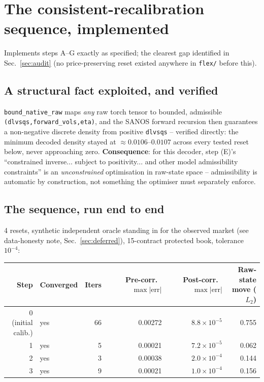 \section{The consistent-recalibration sequence, implemented}
\label{sec:sec5}

Implements steps A--G exactly as specified; the clearest gap identified in
Sec.~\ref{sec:audit} (no price-preserving reset existed anywhere in
\texttt{flex/} before this).

\subsection{A structural fact exploited, and verified}

\texttt{bound\_native\_raw} maps \emph{any} raw torch tensor to bounded,
admissible \texttt{(dlvsqs,forward\_vols,eta)}, and the SANOS forward
recursion then guarantees a non-negative discrete density from positive
\texttt{dlvsqs} -- verified directly: the minimum decoded density stayed at
$\approx0.0106$--$0.0107$ across every tested reset below, never approaching
zero. \textbf{Consequence}: for this decoder, step (E)'s ``constrained
inverse... subject to positivity... and other model admissibility
constraints'' is an \emph{unconstrained} optimisation in raw-state space --
admissibility is automatic by construction, not something the optimiser must
separately enforce.

\subsection{The sequence, run end to end}

4 resets, synthetic independent oracle standing in for the observed market
(see data-honesty note, Sec.~\ref{sec:deferred}), 15-contract protected book,
tolerance $10^{-4}$:

\begin{center}
\begin{tabular}{rlrrrr}
\toprule
Step & Converged & Iters & Pre-corr.\ $\max|\text{err}|$ & Post-corr.\ $\max|\text{err}|$ & Raw-state move ($L_2$) \\
\midrule
0 (initial calib.) & yes & 66 & 0.00272 & $8.8\times10^{-5}$ & 0.755 \\
1 & yes & 5 & 0.00021 & $7.2\times10^{-5}$ & 0.062 \\
2 & yes & 3 & 0.00038 & $2.0\times10^{-4}$ & 0.144 \\
3 & yes & 9 & 0.00021 & $1.0\times10^{-4}$ & 0.156 \\
\bottomrule
\end{tabular}
\end{center}

